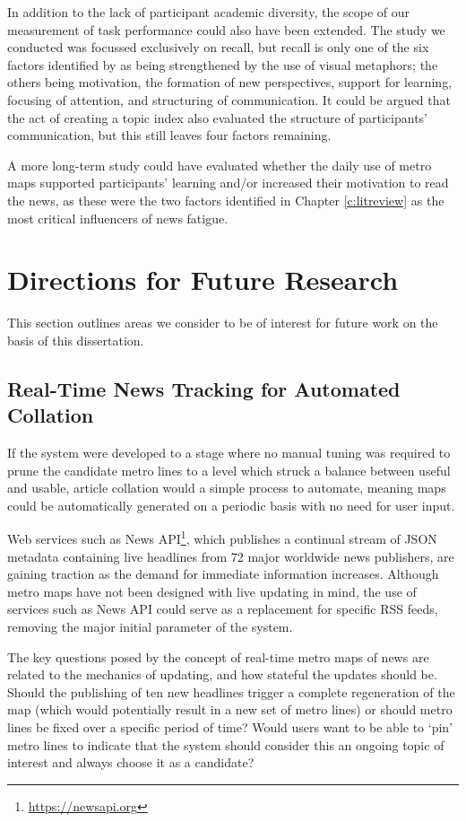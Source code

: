 In addition to the lack of participant academic diversity, the scope of our measurement of task performance could also have been extended. The study we conducted was focussed exclusively on recall, but recall is only one of the six factors identified by \cite{VisuelleKommunikation} as being strengthened by the use of visual metaphors; the others being motivation, the formation of new perspectives, support for learning, focusing of attention, and structuring of communication. It could be argued that the act of creating a topic index also evaluated the structure of participants' communication, but this still leaves four factors remaining.  

A more long-term study could have evaluated whether the daily use of metro maps supported participants' learning and/or increased their motivation to read the news, as these were the two factors identified in Chapter \ref{c:litreview} as the most critical influencers of news fatigue.


\section{Directions for Future Research}

This section outlines areas we consider to be of interest for future work on the basis of this dissertation.

\subsection{Real-Time News Tracking for Automated Collation}

If the system were developed to a stage where no manual tuning was required to prune the candidate metro lines to a level which struck a balance between useful and usable, article collation would a simple process to automate, meaning maps could be automatically generated on a periodic basis with no need for user input.

Web services such as News API\footnote{\url{https://newsapi.org}}, which publishes a continual stream of JSON metadata containing live headlines from 72 major worldwide news publishers, are gaining traction as the demand for immediate information increases. Although metro maps have not been designed with live updating in mind, the use of services such as News API could serve as a replacement for specific RSS feeds, removing the major initial parameter of the system.

The key questions posed by the concept of real-time metro maps of news are related to the mechanics of updating, and how stateful the updates should be. Should the publishing of ten new headlines trigger a complete regeneration of the map (which would potentially result in a new set of metro lines) or should metro lines be fixed over a specific period of time? Would users want to be able to `pin' metro lines to indicate that the system should consider this an ongoing topic of interest and always choose it as a candidate?

